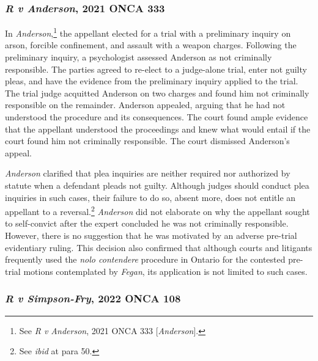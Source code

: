 \subsubsection{\textit{R v Anderson}, 2021 ONCA 333}

In \textit{Anderson},\footnote{See \textit{R v Anderson}, 2021 ONCA 333 [\textit{Anderson}].} the appellant elected for a trial with a preliminary inquiry on arson, forcible confinement, and assault with a weapon charges. Following the preliminary inquiry, a psychologist assessed Anderson as not criminally responsible. The parties agreed to re-elect to a judge-alone trial, enter not guilty pleas, and have the evidence from the preliminary inquiry applied to the trial. The trial judge acquitted Anderson on two charges and found him not criminally responsible on the remainder. Anderson appealed, arguing that he had not understood the procedure and its consequences. The court found ample evidence that the appellant understood the proceedings and knew what would entail if the court found him not criminally responsible. The court dismissed Anderson's appeal. 

\textit{Anderson} clarified that plea inquiries are neither required nor authorized by statute when a defendant pleads not guilty. Although judges should conduct plea inquiries in such cases, their failure to do so, absent more, does not entitle an appellant to a reversal.\footnote{See \textit{ibid} at para 50.} \textit{Anderson} did not elaborate on why the appellant sought to self-convict after the expert concluded he was not criminally responsible. However, there is no suggestion that he was motivated by an adverse pre-trial evidentiary ruling. This decision also confirmed that although courts and litigants frequently used the \textit{nolo contendere} procedure in Ontario for the contested pre-trial motions contemplated by \textit{Fegan}, its application is not limited to such cases.

\subsubsection{\textit{R v Simpson-Fry}, 2022 ONCA 108}

